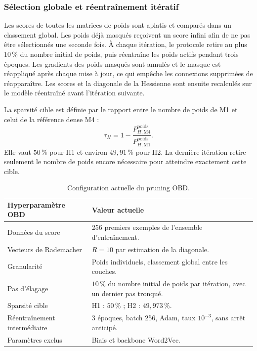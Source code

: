 \subsubsection{Sélection globale et réentraînement itératif}

Les scores de toutes les matrices de poids sont aplatis et comparés dans un
classement global. Les poids déjà masqués reçoivent un score infini afin de ne
pas être sélectionnés une seconde fois. À chaque itération, le protocole retire
au plus $10\,\%$ du nombre initial de poids, puis réentraîne les poids actifs
pendant trois époques. Les gradients des poids masqués sont annulés et le masque
est réappliqué après chaque mise à jour, ce qui empêche les connexions supprimées
de réapparaître. Les scores et la diagonale de la Hessienne sont ensuite
recalculés sur le modèle réentraîné avant l'itération suivante.

La sparsité cible est définie par le rapport entre le nombre de poids de M1 et
celui de la référence dense M4 :
\begin{equation}
    \tau_H
    =1-\frac{P_{H,\mathrm{M4}}^{\mathrm{poids}}}
             {P_{H,\mathrm{M1}}^{\mathrm{poids}}}.
    \label{eq:sparsity_cible_m4}
\end{equation}
Elle vaut $50\,\%$ pour H1 et environ $49{,}91\,\%$ pour H2. La dernière
itération retire seulement le nombre de poids encore nécessaire pour atteindre
exactement cette cible.

\begin{table}[!ht]
    \centering
    \begin{tabularx}{\textwidth}{|l|X|}
        \hline
        Hyperparamètre OBD & Valeur actuelle \\ \hline
        Données du score & 256 premiers exemples de l'ensemble d'entraînement. \\ \hline
        Vecteurs de Rademacher & $R=10$ par estimation de la diagonale. \\ \hline
        Granularité & Poids individuels, classement global entre les couches. \\ \hline
        Pas d'élagage & $10\,\%$ du nombre initial de poids par itération, avec un dernier pas tronqué. \\ \hline
        Sparsité cible & H1 : $50\,\%$ ; H2 : $49{,}973\,\%$. \\ \hline
        Réentraînement intermédiaire & 3 époques, batch 256, Adam, taux $10^{-3}$, sans arrêt anticipé. \\ \hline
        Paramètres exclus & Biais et backbone Word2Vec. \\ \hline
    \end{tabularx}
    \caption{Configuration actuelle du pruning OBD.}
    \label{tab:hyperparametres_obd}
\end{table}

